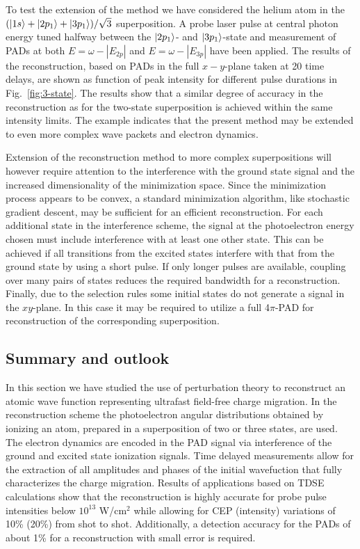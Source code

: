 To test the extension of the method we have considered the helium atom in the $(\ket{1s}+\ket{2p_1}+\ket{3p_1})/\sqrt{3}$ superposition. A probe laser pulse at central photon energy tuned halfway between the $\ket{2p_1}$- and $\ket{3p_1}$-state and measurement of PADs at both $E=\omega-|E_{2p}|$ and $E=\omega-|E_{3p}|$ have been applied. The results of the reconstruction, based on PADs in the full $x-y$-plane taken at 20 time delays, are shown as function of peak intensity for different pulse durations in Fig.~\ref{fig:3-state}. The results show that a similar degree of accuracy in the reconstruction as for the two-state superposition is achieved within the same intensity limits. The example indicates that the present method may be extended to even more complex wave packets and electron dynamics. 

Extension of the reconstruction method to more complex superpositions will however require attention to the interference with the ground state signal and the increased dimensionality of the minimization space. Since the minimization process appears to be convex, a standard minimization algorithm, like stochastic gradient descent, may be sufficient for an efficient reconstruction. For each additional state in the interference scheme, the signal at the photoelectron energy chosen must include interference with at least one other state. This can be achieved if all transitions from the excited states interfere with that from the ground state by using a short pulse. If only longer pulses are available, coupling over many pairs of states reduces the required bandwidth for a reconstruction. Finally, due to the selection rules some initial states do not generate a signal in the $xy$-plane. In this case it may be required to utilize a full 4$\pi$-PAD for reconstruction of the corresponding superposition.

\subsection{Summary and outlook}

In this section we have studied the use of perturbation theory to reconstruct an atomic wave function representing ultrafast field-free charge migration. In the reconstruction scheme the photoelectron angular distributions obtained by ionizing an atom, prepared in a superposition of two or three states, are used. The electron dynamics are encoded in the PAD signal via interference of the ground and excited state ionization signals. Time delayed measurements allow for the extraction of all amplitudes and phases of the initial wavefuction that fully characterizes the charge migration. Results of applications based on TDSE calculations show that the reconstruction is highly accurate for probe pulse intensities below $10^{13}$ W/cm$^2$ while allowing for CEP (intensity) variations of 10\% (20\%) from shot to shot. Additionally, a detection accuracy for the PADs of about 1\% for a  reconstruction with small error is required.


